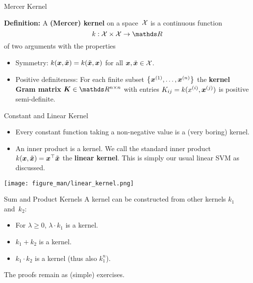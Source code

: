 \begin{vbframe}{Mercer Kernel}


  \textbf{Definition:} A \textbf{(Mercer) kernel} on a space~$\mathcal{X}$ is a
  continuous function
  $$ k : \Xspace \times \Xspace \to \R $$
  of two arguments with the properties
  \begin{itemize}
    \item Symmetry: $k(\bm{x}, \tilde {\bm{x}}) = k(\tilde {\bm{x}}, \bm{x})$ for all
    $\bm{x}, \tilde {\bm{x}} \in \mathcal{X}$.
    \item Positive definiteness: For each finite subset $\left\{\bm{x}^{(1)}, \dots, \bm{x}^{(n)}\right\}$
    the \textbf{kernel Gram matrix} $\bm{K} \in \R^{n \times n}$ with entries
    $K_{ij} = k(x^{(i)}, \bm{x}^{(j)})$ is positive semi-definite.
  \end{itemize}

\end{vbframe}

\begin{vbframe}{Constant and Linear Kernel}

  \begin{itemize}
    \item Every constant function taking a non-negative value is a
    (very boring) kernel.
    \item An inner product is a kernel.
    We call the standard inner product $k(\bm{x}, \tilde {\bm{x}}) = \bm{x}^\top \tilde {\bm{x}}$
    the \textbf{linear kernel}. This is simply our usual linear SVM as discussed.
  \end{itemize}
  

\begin{center}
\texttt{[image: figure\_man/linear\_kernel.png]}
\end{center}

\end{vbframe}

\begin{vbframe}{Sum and Product Kernels}
    A kernel can be constructed from other kernels $k_1$ and~$k_2$:
  \begin{itemize}
      \item For $\lambda \geq 0$, $\lambda \cdot k_1$ is a kernel.
      \item $k_1 + k_2$ is a kernel.
      \item $k_1 \cdot k_2$ is a kernel (thus also $k_1^n$).
    \end{itemize}
    
    \lz

    The proofs remain as (simple) exercises.
\end{vbframe}

